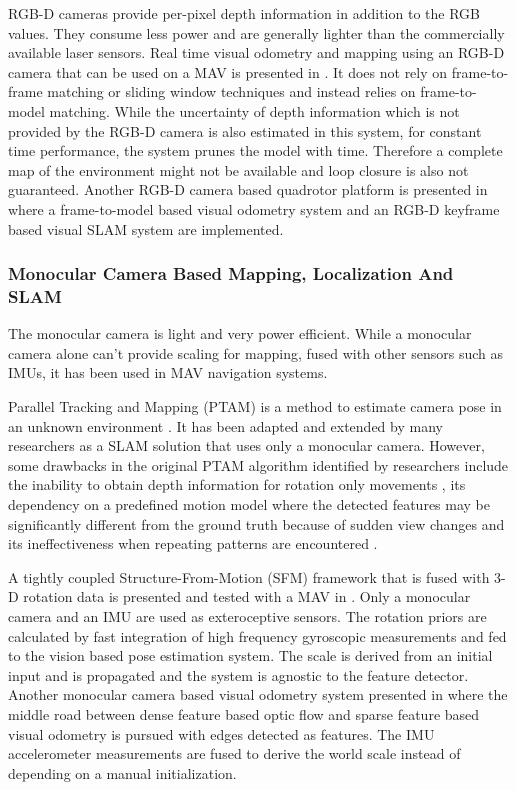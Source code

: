 \documentclass[12pt,a4paper]{report}
\begin{document}
RGB-D cameras provide per-pixel depth information in addition to the RGB values. They consume less power and are generally lighter than the commercially available laser sensors. Real time visual odometry and mapping using an RGB-D camera that can be used on a MAV is presented in \cite{dryanovski2013fast}. It does not rely on frame-to-frame matching or sliding window techniques and instead relies on frame-to-model matching. While the uncertainty of depth information which is not provided by the RGB-D camera is also estimated in this system, for constant time performance, the system prunes the model with time. Therefore a complete map of the environment might not be available and loop closure is also not guaranteed. Another RGB-D camera based quadrotor platform is presented in \cite{valenti2014autonomous} where a frame-to-model based visual odometry system and an RGB-D keyframe based visual SLAM system are implemented. 

\subsubsection{Monocular Camera Based Mapping, Localization And SLAM}
\label{litMonoSLAM}
The monocular camera is light and very power efficient. While a monocular camera alone can't provide scaling for mapping, fused with other sensors such as IMUs, it has been used in MAV navigation systems. \par

Parallel Tracking and Mapping (PTAM) is a method to estimate camera pose in an unknown environment \cite{klein2007parallel}. It has been adapted and extended by many researchers as a SLAM solution that uses only a monocular camera. However, some drawbacks in the original PTAM algorithm identified by researchers include the inability to obtain depth information for rotation only movements \cite{schauwecker2014board}, its dependency on a predefined motion model where the detected features may be significantly different from the ground truth because of sudden view changes \cite{huang2015monocular} and its ineffectiveness when repeating patterns are encountered \cite{zhang2015autonomous}. \par

A tightly coupled Structure-From-Motion (SFM) framework that is fused with 3-D rotation data is presented and tested with a MAV in \cite{kneip2011robust}. Only a monocular camera and an IMU are used as exteroceptive sensors. The rotation priors are calculated by fast integration of high frequency gyroscopic measurements and fed to the vision based pose estimation system. The scale is derived from an initial input and is propagated and the system is agnostic to the feature detector. Another monocular camera based visual odometry system presented in \cite{jose2015realtime} where the middle road between dense feature based optic flow and sparse feature based visual odometry is pursued with edges detected as features. The IMU accelerometer measurements are fused to derive the world scale instead of depending on a manual initialization. 
\end{document}
